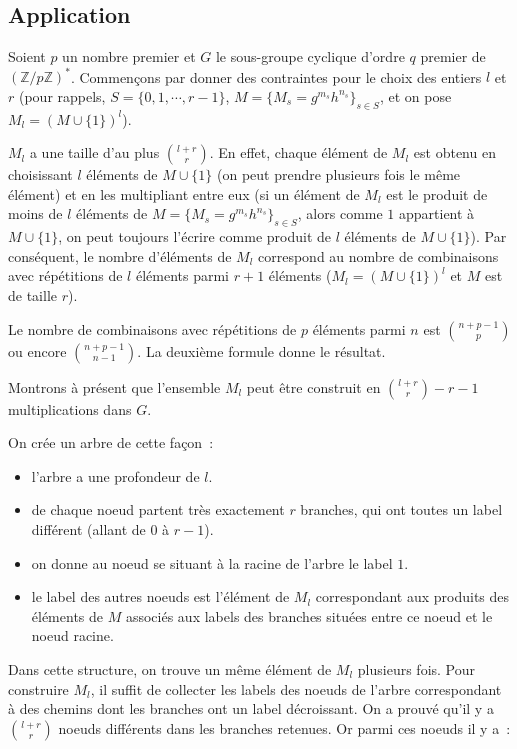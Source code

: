     \subsection{Application}
    Soient $p$ un nombre premier et $G$ le sous-groupe cyclique d'ordre $q$ premier de $(\mathbb{Z}/p\mathbb{Z})^*$. Commençons par donner des contraintes pour le choix des entiers $l$ et $r$ (pour rappels, $S = \{0,1,\cdots,r-1\}$, $M=\{M_s = g^{m_s} h^{n_s}\}_{s \in S}$, et on pose $M_l = (M\cup\{1\})^l$).

    $M_l$ a une taille d'au plus $\binom{l+r}{r}$. En effet, chaque élément de $M_l$ est obtenu en choisissant $l$ éléments de $M\cup\{1\}$ (on peut prendre plusieurs fois le même élément) et en les multipliant entre eux (si un élément de $M_l$ est le produit de moins de $l$ éléments de $M = \{M_s = g^{m_s} h^{n_s}\}_{s \in S}$, alors comme $1$ appartient à $M\cup\{1\}$, on peut toujours l'écrire comme produit de $l$ éléments de $M\cup\{1\}$). Par conséquent, le nombre d'éléments de $M_l$ correspond au nombre de combinaisons avec répétitions de $l$ éléments parmi $r + 1$ éléments ($M_l = (M\cup\{1\})^l$ et $M$ est de taille $r$).

    Le nombre de combinaisons avec répétitions de $p$ éléments parmi $n$ est $\binom{n+p-1}{p}$ ou encore $\binom{n+p-1}{n-1}$. La deuxième formule donne le résultat.

    Montrons à présent que l'ensemble $M_l$ peut être construit en $\binom{l+r}{r} - r - 1$ multiplications dans $G$.

    On crée un arbre de cette façon~:

    \begin{itemize}
      \item l'arbre a une profondeur de $l$.
      \item de chaque noeud partent très exactement $r$ branches, qui ont toutes un label différent (allant de $0$ à $r - 1$).
      \item on donne au noeud se situant à la racine de l'arbre le label $1$.
      \item le label des autres noeuds est l'élément de $M_l$ correspondant aux produits des éléments de $M$ associés aux labels des branches situées entre ce noeud et le noeud racine.
    \end{itemize}

    Dans cette structure, on trouve un même élément de $M_l$ plusieurs fois. Pour construire $M_l$, il suffit de collecter les labels des noeuds de l'arbre correspondant à des chemins dont les branches ont un label décroissant. On a prouvé qu'il y a $\binom{l+r}{r}$ noeuds différents dans les branches retenues. Or parmi ces noeuds il y a~:

